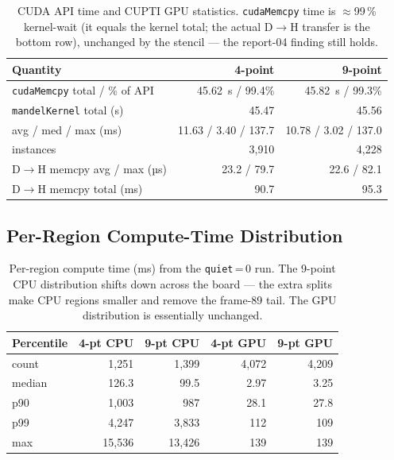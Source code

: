 \documentclass[
	english,
	letterpaper, oneside
]{article}
\begin{document}
\begin{table}[H]
    \centering
    \caption{CUDA API time and CUPTI GPU statistics. \texttt{cudaMemcpy} time is
             $\approx$99\,\% kernel-wait (it equals the kernel total; the actual
             D$\rightarrow$H transfer is the bottom row), unchanged by the
             stencil --- the report-04 finding still holds.}
    \label{tab:cuda}
    \begin{tabular}{lrr}
        \hline
        Quantity & 4-point & 9-point \\
        \hline
        \texttt{cudaMemcpy} total / \% of API   & 45.62~s / 99.4\% & 45.82~s / 99.3\% \\
        \texttt{mandelKernel} total (s)          & 45.47 & 45.56 \\
        \quad avg / med / max (ms)               & 11.63 / 3.40 / 137.7 & 10.78 / 3.02 / 137.0 \\
        \quad instances                          & 3{,}910 & 4{,}228 \\
        D$\rightarrow$H memcpy avg / max (µs)    & 23.2 / 79.7 & 22.6 / 82.1 \\
        D$\rightarrow$H memcpy total (ms)        & 90.7 & 95.3 \\
        \hline
    \end{tabular}
\end{table}

\subsection{Per-Region Compute-Time Distribution}

\begin{table}[H]
    \centering
    \caption{Per-region compute time (ms) from the \texttt{quiet}\,=\,0 run.
             The 9-point CPU distribution shifts down across the board --- the
             extra splits make CPU regions smaller and remove the frame-89 tail.
             The GPU distribution is essentially unchanged.}
    \label{tab:dist}
    \begin{tabular}{lrrrr}
        \hline
        Percentile & 4-pt CPU & 9-pt CPU & 4-pt GPU & 9-pt GPU \\
        \hline
        count    & 1{,}251 & 1{,}399 & 4{,}072 & 4{,}209 \\
        median   & 126.3   & 99.5    & 2.97    & 3.25 \\
        p90      & 1{,}003 & 987     & 28.1    & 27.8 \\
        p99      & 4{,}247 & 3{,}833 & 112     & 109 \\
        max      & 15{,}536 & 13{,}426 & 139   & 139 \\
        \hline
    \end{tabular}
\end{table}
\end{document}
